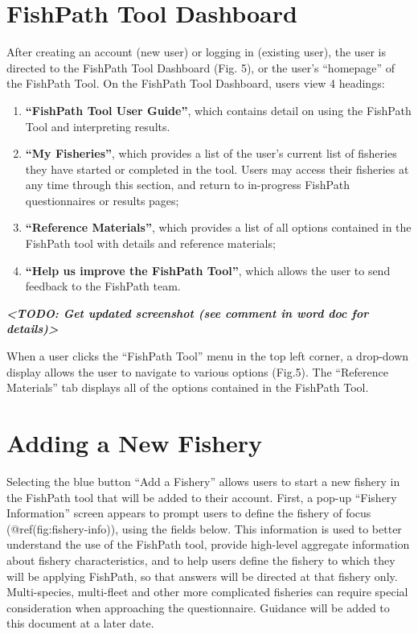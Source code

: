 \documentclass[11pt,]{book}
\providecommand{\tightlist}{%
  \setlength{\itemsep}{0pt}\setlength{\parskip}{0pt}}
\begin{document}
\hypertarget{fishpath-tool-dashboard}{%
\section{FishPath Tool Dashboard}\label{fishpath-tool-dashboard}}

After creating an account (new user) or logging in (existing user), the
user is directed to the FishPath Tool Dashboard (Fig. 5), or the user's
``homepage'' of the FishPath Tool. On the FishPath Tool Dashboard, users
view 4 headings:

\begin{enumerate}
\def\labelenumi{\arabic{enumi}.}
\tightlist
\item
  \textbf{``FishPath Tool User Guide''}, which contains detail on using
  the FishPath Tool and interpreting results.
\item
  \textbf{``My Fisheries''}, which provides a list of the user's current
  list of fisheries they have started or completed in the tool. Users
  may access their fisheries at any time through this section, and
  return to in-progress FishPath questionnaires or results pages;
\item
  \textbf{``Reference Materials''}, which provides a list of all options
  contained in the FishPath tool with details and reference materials;
\item
  \textbf{``Help us improve the FishPath Tool''}, which allows the user
  to send feedback to the FishPath team.
\end{enumerate}

\textbf{\emph{\textless TODO: Get updated screenshot (see comment in
word doc for details)\textgreater{}}}

When a user clicks the ``FishPath Tool'' menu in the top left corner, a
drop-down display allows the user to navigate to various options
(Fig.5). The ``Reference Materials'' tab displays all of the options
contained in the FishPath Tool.

\hypertarget{adding-a-new-fishery}{%
\section{Adding a New Fishery}\label{adding-a-new-fishery}}

Selecting the blue button ``Add a Fishery'' allows users to start a new
fishery in the FishPath tool that will be added to their account. First,
a pop-up ``Fishery Information'' screen appears to prompt users to
define the fishery of focus (@ref(fig:fishery-info)), using the fields
below. This information is used to better understand the use of the
FishPath tool, provide high-level aggregate information about fishery
characteristics, and to help users define the fishery to which they will
be applying FishPath, so that answers will be directed at that fishery
only. Multi-species, multi-fleet and other more complicated fisheries
can require special consideration when approaching the questionnaire.
Guidance will be added to this document at a later date.
\end{document}
